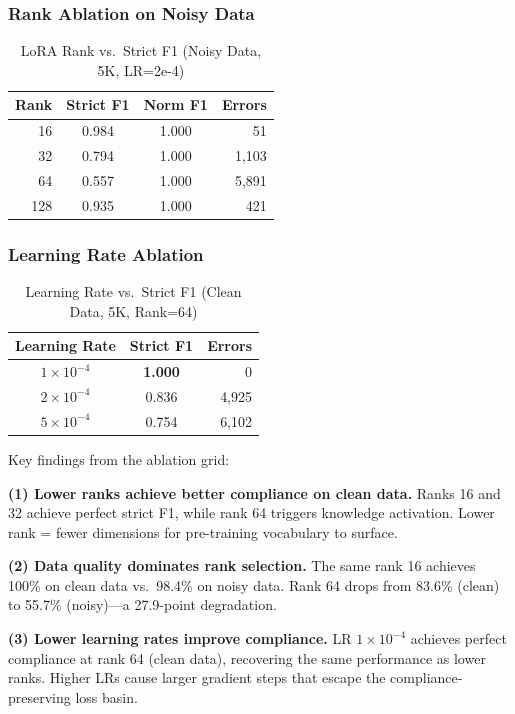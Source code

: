 \documentclass[review,3p]{elsarticle}
\begin{document}
\subsubsection{Rank Ablation on Noisy Data}

\begin{table}[!ht]
\centering
\caption{LoRA Rank vs.\ Strict F1 (Noisy Data, 5K, LR=2e-4)}
\label{tab:rank-noisy}
\begin{tabular}{rccr}
\toprule
\textbf{Rank} & \textbf{Strict F1} & \textbf{Norm F1} & \textbf{Errors} \\
\midrule
16 & 0.984 & 1.000 & 51 \\
32 & 0.794 & 1.000 & 1,103 \\
64 & 0.557 & 1.000 & 5,891 \\
128 & 0.935 & 1.000 & 421 \\
\bottomrule
\end{tabular}
\end{table}

\subsubsection{Learning Rate Ablation}

\begin{table}[!ht]
\centering
\caption{Learning Rate vs.\ Strict F1 (Clean Data, 5K, Rank=64)}
\label{tab:lr}
\begin{tabular}{ccr}
\toprule
\textbf{Learning Rate} & \textbf{Strict F1} & \textbf{Errors} \\
\midrule
$1 \times 10^{-4}$ & \textbf{1.000} & 0 \\
$2 \times 10^{-4}$ & 0.836 & 4,925 \\
$5 \times 10^{-4}$ & 0.754 & 6,102 \\
\bottomrule
\end{tabular}
\end{table}

Key findings from the ablation grid:

\textbf{(1) Lower ranks achieve better compliance on clean data.} Ranks 16 and 32 achieve perfect strict F1, while rank 64 triggers knowledge activation. Lower rank = fewer dimensions for pre-training vocabulary to surface.

\textbf{(2) Data quality dominates rank selection.} The same rank 16 achieves 100\% on clean data vs.\ 98.4\% on noisy data. Rank 64 drops from 83.6\% (clean) to 55.7\% (noisy)---a 27.9-point degradation.

\textbf{(3) Lower learning rates improve compliance.} LR $1 \times 10^{-4}$ achieves perfect compliance at rank 64 (clean data), recovering the same performance as lower ranks. Higher LRs cause larger gradient steps that escape the compliance-preserving loss basin.
\end{document}
